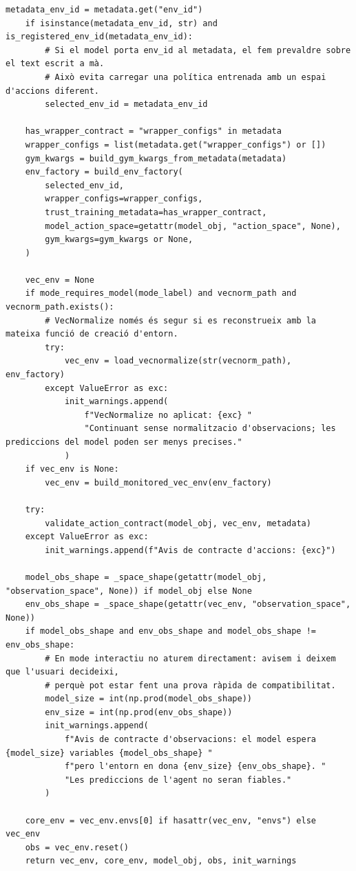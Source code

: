 \documentclass[10pt,a4paper]{article}
\begin{document}
\begin{lstlisting}[style=studioPython,caption={backend/interaccionar\_agent\_backend.py},label={lst:backend-interaccionar-agent-backend-py}]
    metadata_env_id = metadata.get("env_id")
    if isinstance(metadata_env_id, str) and is_registered_env_id(metadata_env_id):
        # Si el model porta env_id al metadata, el fem prevaldre sobre el text escrit a mà.
        # Això evita carregar una política entrenada amb un espai d'accions diferent.
        selected_env_id = metadata_env_id

    has_wrapper_contract = "wrapper_configs" in metadata
    wrapper_configs = list(metadata.get("wrapper_configs") or [])
    gym_kwargs = build_gym_kwargs_from_metadata(metadata)
    env_factory = build_env_factory(
        selected_env_id,
        wrapper_configs=wrapper_configs,
        trust_training_metadata=has_wrapper_contract,
        model_action_space=getattr(model_obj, "action_space", None),
        gym_kwargs=gym_kwargs or None,
    )

    vec_env = None
    if mode_requires_model(mode_label) and vecnorm_path and vecnorm_path.exists():
        # VecNormalize només és segur si es reconstrueix amb la mateixa funció de creació d'entorn.
        try:
            vec_env = load_vecnormalize(str(vecnorm_path), env_factory)
        except ValueError as exc:
            init_warnings.append(
                f"VecNormalize no aplicat: {exc} "
                "Continuant sense normalitzacio d'observacions; les prediccions del model poden ser menys precises."
            )
    if vec_env is None:
        vec_env = build_monitored_vec_env(env_factory)

    try:
        validate_action_contract(model_obj, vec_env, metadata)
    except ValueError as exc:
        init_warnings.append(f"Avis de contracte d'accions: {exc}")

    model_obs_shape = _space_shape(getattr(model_obj, "observation_space", None)) if model_obj else None
    env_obs_shape = _space_shape(getattr(vec_env, "observation_space", None))
    if model_obs_shape and env_obs_shape and model_obs_shape != env_obs_shape:
        # En mode interactiu no aturem directament: avisem i deixem que l'usuari decideixi,
        # perquè pot estar fent una prova ràpida de compatibilitat.
        model_size = int(np.prod(model_obs_shape))
        env_size = int(np.prod(env_obs_shape))
        init_warnings.append(
            f"Avis de contracte d'observacions: el model espera {model_size} variables {model_obs_shape} "
            f"pero l'entorn en dona {env_size} {env_obs_shape}. "
            "Les prediccions de l'agent no seran fiables."
        )

    core_env = vec_env.envs[0] if hasattr(vec_env, "envs") else vec_env
    obs = vec_env.reset()
    return vec_env, core_env, model_obj, obs, init_warnings



\end{lstlisting}
\end{document}
